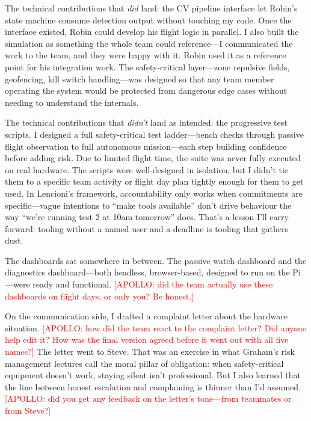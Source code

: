 The technical contributions that \emph{did} land: the CV pipeline interface let Robin's state machine consume detection output without touching my code. Once the interface existed, Robin could develop his flight logic in parallel. I also built the simulation as something the whole team could reference---I communicated the work to the team, and they were happy with it. Robin used it as a reference point for his integration work. The safety-critical layer---zone repulsive fields, geofencing, kill switch handling---was designed so that any team member operating the system would be protected from dangerous edge cases without needing to understand the internals.

The technical contributions that \emph{didn't} land as intended: the progressive test scripts. I designed a full safety-critical test ladder---bench checks through passive flight observation to full autonomous mission---each step building confidence before adding risk. Due to limited flight time, the suite was never fully executed on real hardware. The scripts were well-designed in isolation, but I didn't tie them to a specific team activity or flight day plan tightly enough for them to get used. In Lencioni's framework, accountability only works when commitments are specific---vague intentions to ``make tools available'' don't drive behaviour the way ``we're running test 2 at 10am tomorrow'' does. That's a lesson I'll carry forward: tooling without a named user and a deadline is tooling that gathers dust.

The dashboards sat somewhere in between. The passive watch dashboard and the diagnostics dashboard---both headless, browser-based, designed to run on the Pi---were ready and functional. \textcolor{red}{[APOLLO: did the team actually use these dashboards on flight days, or only you? Be honest.]}

On the communication side, I drafted a complaint letter about the hardware situation. \textcolor{red}{[APOLLO: how did the team react to the complaint letter? Did anyone help edit it? How was the final version agreed before it went out with all five names?]} The letter went to Steve. That was an exercise in what Graham's risk management lectures call the moral pillar of obligation: when safety-critical equipment doesn't work, staying silent isn't professional. But I also learned that the line between honest escalation and complaining is thinner than I'd assumed. \textcolor{red}{[APOLLO: did you get any feedback on the letter's tone---from teammates or from Steve?]}

